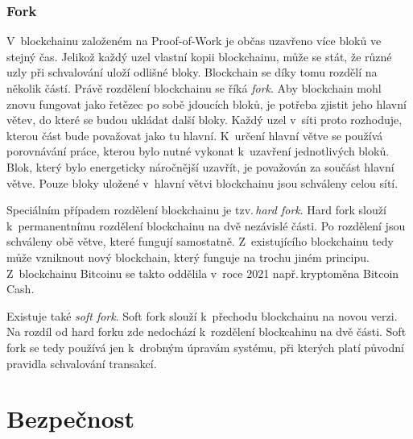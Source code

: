 \documentclass[12pt]{report}			%
\begin{document}
		\subsection{Fork}{
V~blockchainu založeném na Proof-of-Work je občas uzavřeno více bloků ve stejný čas. Jelikož každý uzel vlastní kopii blockchainu, může se stát, že různé uzly při schvalování uloží odlišné bloky. Blockchain se díky tomu rozdělí na několik částí. Právě rozdělení blockchainu se říká \textit{fork}. Aby blockchain mohl znovu fungovat jako řetězec po sobě jdoucích bloků, je potřeba zjistit jeho hlavní větev, do které se budou ukládat další bloky. Každý uzel v~síti proto rozhoduje, kterou část bude považovat jako tu hlavní. K~určení hlavní větve se používá porovnávání práce, kterou bylo nutné vykonat k~uzavření jednotlivých bloků. Blok, který bylo energeticky náročnější uzavřít, je považován za součást hlavní větve. Pouze bloky uložené v~hlavní větvi blockchainu jsou schváleny celou sítí. \cite{Antonopoulos2017}

Speciálním případem rozdělení blockchainu je tzv.\,\textit{hard fork}. Hard fork slouží k~permanentnímu rozdělení blockchainu na dvě nezávislé části. Po rozdělení jsou schváleny obě větve, které fungují samostatně. Z~existujícího blockchainu tedy může vzniknout nový blockchain, který funguje na trochu jiném principu. Z~blockchainu Bitcoinu se takto oddělila v~roce 2021 např.\,kryptoměna Bitcoin Cash.  \cite{Antonopoulos2017}\cite{Peters2021}

Existuje také \textit{soft fork}. Soft fork slouží k~přechodu blockchainu na novou verzi. Na rozdíl od hard forku zde nedochází k~rozdělení blockcahinu na dvě části. Soft fork se tedy používá jen k~drobným úpravám systému, při kterých platí původní pravidla schvalování transakcí. \cite{Antonopoulos2017}
}
		\chapter{Bezpečnost}
\end{document}

